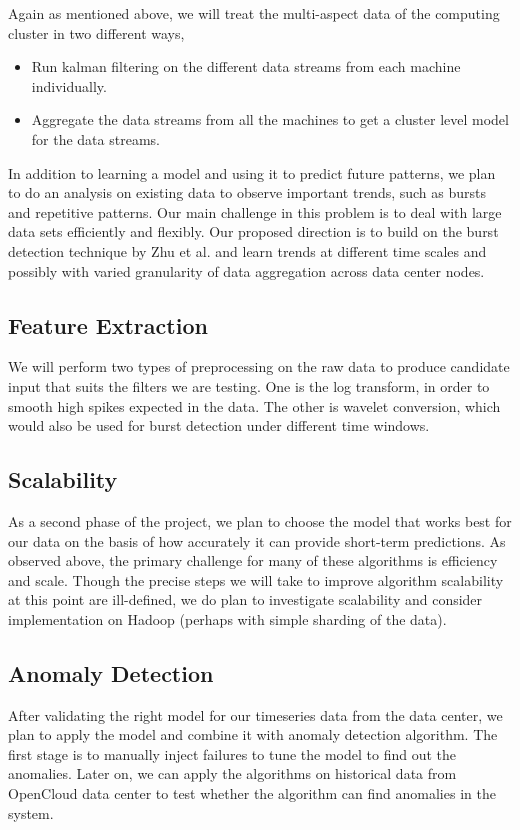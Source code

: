 Again as mentioned above, we will treat the multi-aspect data of the computing cluster in two different ways,

\begin{itemize}
\item Run kalman filtering on the different data streams from each machine individually.
\item Aggregate the data streams from all the machines to get a cluster level model for the data streams.
\end{itemize}

In addition to learning a model and using it to predict future patterns, we plan to do an analysis on existing data to observe important trends, such as bursts and repetitive patterns. Our main challenge in this problem is to deal with large data sets efficiently and flexibly. Our proposed direction is to build on the burst detection technique by Zhu et al. \cite{Zhu2003} and learn trends at different time scales and possibly with varied granularity of data aggregation across data center nodes.

\subsection{Feature Extraction}
\label{sec:method:features}
We will perform two types of preprocessing on the raw data to produce candidate input that suits the filters we are testing. One is the log transform, in order to smooth high spikes expected in the data. The other is wavelet conversion, which would also be used for burst detection under different time windows.

\subsection{Scalability}
\label{sec:method:scale}
As a second phase of the project, we plan to choose the model that works best for our data on the basis of how accurately it can provide short-term predictions. As observed above, the primary challenge for many of these algorithms is efficiency and scale. Though the precise steps we will take to improve algorithm scalability at this point are ill-defined, we do plan to investigate scalability and consider implementation on Hadoop (perhaps with simple sharding of the data).

\subsection{Anomaly Detection}
\label{sec:method:anomaly}
After validating the right model for our timeseries data from the data center, we plan to apply the model and combine it with anomaly detection algorithm. The first stage is to manually inject failures to tune the model to find out the anomalies. Later on, we can apply the algorithms on historical data from OpenCloud data center to test whether the algorithm can find anomalies in the system.



\newpage
{}


